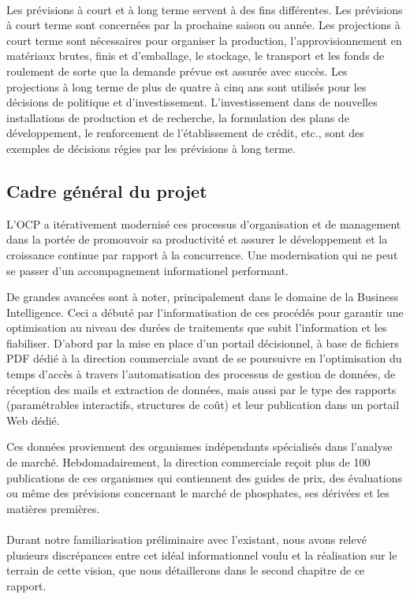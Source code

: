 	\paragraph{}
	Les prévisions à court et à long terme servent à des fins différentes. Les prévisions à court terme sont concernées par la prochaine saison ou année. Les projections à court terme sont nécessaires pour organiser la production, l'approvisionnement en matériaux brutes, finis et d'emballage, le stockage, le transport et les fonds de roulement de sorte que la demande prévue est assurée avec succès. Les projections à long terme de plus de quatre à cinq ans sont utilisés pour les décisions de politique et d'investissement. L'investissement dans de nouvelles installations de production et de recherche, la formulation des plans de développement, le renforcement de l'établissement de crédit, etc., sont des exemples de décisions régies par les prévisions à long terme.
	\subsection{Cadre général du projet}
	L'OCP a itérativement modernisé ces processus d'organisation et de management dans la portée de promouvoir sa productivité et assurer le développement et la croissance continue
	par rapport à la concurrence. Une modernisation qui ne peut se passer d'un accompagnement informationel performant.\par
	De grandes avancées sont à noter, principalement dans le domaine de la Business Intelligence. Ceci a débuté par l’informatisation de ces procédés pour garantir une optimisation au niveau des durées de traitements que subit l’information et les fiabiliser. D'abord par la mise en place d’un portail décisionnel, à base de fichiers PDF dédié à la direction commerciale avant de se poursuivre en l’optimisation du temps d’accès à travers l’automatisation des processus de gestion de données, de
	réception des mails et extraction de données, mais aussi par le type des rapports (paramétrables
	interactifs, structures de coût) et leur publication dans un portail Web dédié.
	\par
	Ces données proviennent des organismes indépendants spécialisés dans l'analyse de marché. Hebdomadairement, la direction commerciale reçoit plus de 100 publications de ces organismes qui contiennent des guides de prix, des évaluations ou même des prévisions concernant le marché de phosphates, ses dérivées et les matières premières.
	\paragraph{}
	Durant notre familiarisation préliminaire avec l'existant, nous avons relevé plusieurs discrépances entre cet idéal informationnel voulu et la réalisation sur le terrain de cette vision, que nous détaillerons dans le second chapitre de ce rapport.
